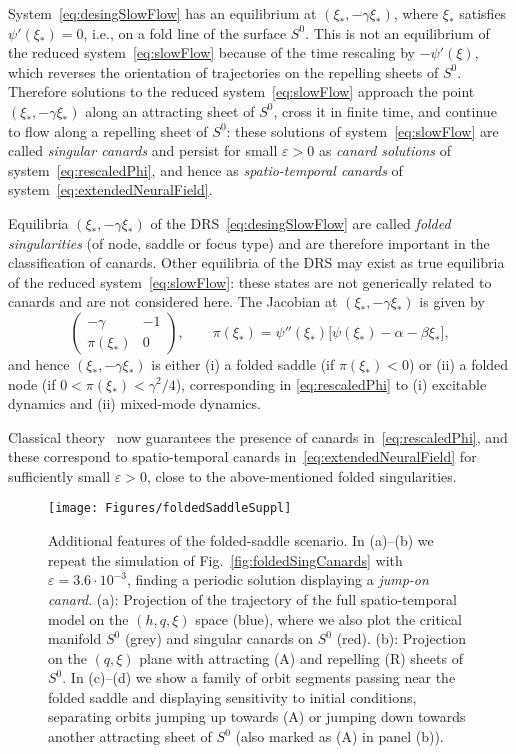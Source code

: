 \documentclass[aps,prl,reprint,superscriptaddress]{revtex4-1}
\newcommand{\epsi}{\varepsilon}
\newcommand{\edits}[1]{#1}
\begin{document}
System~\eqref{eq:desingSlowFlow} has an equilibrium at $(\xi_*,-\gamma \xi_*)$, where
$\xi_*$ satisfies $\psi'(\xi_*) = 0$, i.e., on a fold line of the surface
\edits{$S^0$}. This is not an equilibrium of the reduced system~\eqref{eq:slowFlow}
because of the time rescaling by $-\psi'(\xi)$, which reverses the orientation of
trajectories on the repelling sheets of $S^0$. Therefore solutions to the reduced
system~\eqref{eq:slowFlow} approach the point $(\xi_*,-\gamma \xi_*)$ along an
attracting sheet of $S^0$,
cross it in finite time, and continue to flow along a repelling sheet of $S^0$: these
solutions of system~\eqref{eq:slowFlow} are called \emph{singular canards} and
persist for small $\epsi>0$ as \emph{canard solutions} of
system~\eqref{eq:rescaledPhi}, and hence as \emph{spatio-temporal canards} of
system~\eqref{eq:extendedNeuralField}. 

Equilibria $(\xi_*,-\gamma \xi_*)$ of the DRS~\eqref{eq:desingSlowFlow} are called
\textit{folded singularities} (of node, saddle or focus type) and are therefore
important \edits{in the classification of canards}. Other equilibria of the DRS may exist as true
equilibria of the reduced system~\eqref{eq:slowFlow}: these states are not
generically related to canards and are not considered here. The Jacobian at
$(\xi_*,-\gamma \xi_*)$ is given by
\[
\begin{pmatrix}
  - \gamma & -1  \\
  \pi(\xi_*) & 0
\end{pmatrix},
\qquad
\pi(\xi_*) = \psi''(\xi_*)\big[ \psi(\xi_*) - \alpha -\beta \xi_* \big],
\]
and hence \edits{$(\xi_*,-\gamma \xi_*)$ is either (i) a folded saddle (if $\pi(\xi_*) < 0$)
or (ii) a folded node (if $0 < \pi(\xi_*) < \gamma^2/4$), corresponding in \eqref{eq:rescaledPhi}
to (i) excitable dynamics and (ii) mixed-mode dynamics.}

\edits{Classical theory~\cite{Desroches2012} now guarantees the presence of
canards in~\eqref{eq:rescaledPhi}, and these correspond} to
spatio-temporal canards in~\eqref{eq:extendedNeuralField} for sufficiently
small $\epsi>0$, close to the above-mentioned folded singularities.

\begin{figure*}
  \texttt{[image: Figures/foldedSaddleSuppl]}
  \caption{Additional features of the folded-saddle scenario. In (a)--(b) we repeat
  the simulation of Fig.~\ref{fig:foldedSingCanards} with $\epsi = 3.6 \cdot 10^{-3}$,
  finding a periodic solution displaying a \emph{jump-on canard}. (a): Projection of the
  trajectory of the full spatio-temporal model on the $(h,q,\xi)$ space (blue), where
  we also plot the critical manifold $S^0$ (grey) and singular canards on $S^0$
  (red). (b): Projection on the \edits{$(q,\xi)$} plane with attracting (A) and repelling (R)
  sheets of $S^0$. In (c)--(d) we show a family of orbit segments passing near the
  folded saddle and displaying sensitivity to initial conditions, separating
  orbits jumping up towards (A) or jumping down towards another attracting sheet of
  $S^0$ (also marked as (A) in panel (b)).}
  \label{fig:foldedSaddleSuppl}
\end{figure*}
\end{document}

